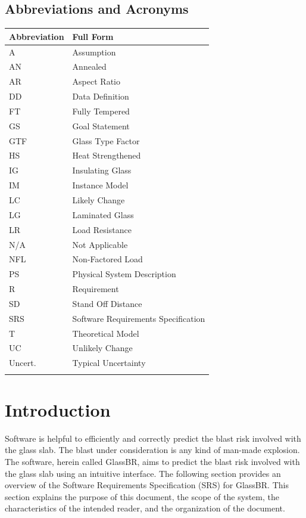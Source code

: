 \documentclass[12pt]{article}
\begin{document}
\subsection{Abbreviations and Acronyms}
\label{Sec:TAbbAcc}
\begin{longtable*}{l l}
\toprule
Abbreviation & Full Form
\\
\midrule
\endhead
A & Assumption
\\
AN & Annealed
\\
AR & Aspect Ratio
\\
DD & Data Definition
\\
FT & Fully Tempered
\\
GS & Goal Statement
\\
GTF & Glass Type Factor
\\
HS & Heat Strengthened
\\
IG & Insulating Glass
\\
IM & Instance Model
\\
LC & Likely Change
\\
LG & Laminated Glass
\\
LR & Load Resistance
\\
N/A & Not Applicable
\\
NFL & Non-Factored Load
\\
PS & Physical System Description
\\
R & Requirement
\\
SD & Stand Off Distance
\\
SRS & Software Requirements Specification
\\
T & Theoretical Model
\\
UC & Unlikely Change
\\
Uncert. & Typical Uncertainty
\\
\bottomrule
\label{Table:TAbbAcc}
\end{longtable*}
\section{Introduction}
\label{Sec:Intro}
Software is helpful to efficiently and correctly predict the blast risk involved with the glass slab. The blast under consideration is any kind of man-made explosion. The software, herein called GlassBR, aims to predict the blast risk involved with the glass slab using an intuitive interface.
The following section provides an overview of the Software Requirements Specification (SRS) for GlassBR. This section explains the purpose of this document, the scope of the system, the characteristics of the intended reader, and the organization of the document.
\end{document}
